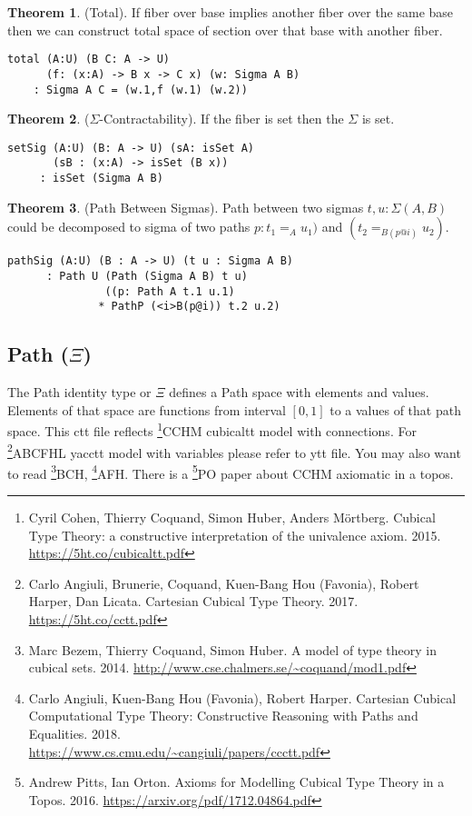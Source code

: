 \documentclass{article}
\theoremstyle{definition}
\newtheorem{theorem}{Theorem}
\begin{document}
\begin{theorem} (Total).
If fiber over base implies another fiber
over the same base then we can construct total space of section
over that base with another fiber.
\begin{lstlisting}
total (A:U) (B C: A -> U)
      (f: (x:A) -> B x -> C x) (w: Sigma A B)
    : Sigma A C = (w.1,f (w.1) (w.2))
\end{lstlisting}
\end{theorem}

\begin{theorem} ($\Sigma$-Contractability). If the fiber is set then the $\Sigma$ is set.
\begin{lstlisting}
setSig (A:U) (B: A -> U) (sA: isSet A)
       (sB : (x:A) -> isSet (B x))
     : isSet (Sigma A B)
\end{lstlisting}
\end{theorem}

\begin{theorem} (Path Between Sigmas).
Path between two sigmas $t,u: \Sigma(A,B)$ could be decomposed to
sigma of two paths $p:t_1=_{A}u_1)$ and $(t_2=_{B(p@i)}u_2)$.
\begin{lstlisting}
pathSig (A:U) (B : A -> U) (t u : Sigma A B)
      : Path U (Path (Sigma A B) t u)
               ((p: Path A t.1 u.1)
              * PathP (<i>B(p@i)) t.2 u.2)
\end{lstlisting}
\end{theorem}

\subsection{Path ($\Xi$)}

The Path identity type or $\Xi$ defines a Path space with elements and values.
Elements of that space are functions from interval $[0,1]$ to a values of that path space.
This ctt file reflects \footnote{Cyril Cohen, Thierry Coquand, Simon Huber, Anders M{\"{o}}rtberg. Cubical Type Theory: a constructive interpretation of the univalence axiom. 2015. \url{https://5ht.co/cubicaltt.pdf}}{CCHM} cubicaltt model with connections.
For \footnote{Carlo Angiuli, Brunerie, Coquand, Kuen-Bang Hou (Favonia), Robert Harper, Dan Licata. Cartesian Cubical Type Theory. 2017. \url{https://5ht.co/cctt.pdf}}{ABCFHL} yacctt model with
variables please refer to ytt file. You may also want to
read \footnote{Marc Bezem, Thierry Coquand, Simon Huber. A model of type theory in cubical sets. 2014. \url{http://www.cse.chalmers.se/~coquand/mod1.pdf}}{BCH},
\footnote{Carlo Angiuli, Kuen-Bang Hou (Favonia), Robert Harper. Cartesian Cubical Computational Type Theory: Constructive Reasoning with Paths and Equalities. 2018. \\ \url{https://www.cs.cmu.edu/~cangiuli/papers/ccctt.pdf}}{AFH}.
There is a \footnote{Andrew Pitts, Ian Orton. Axioms for Modelling Cubical Type Theory in a Topos. 2016. \url{https://arxiv.org/pdf/1712.04864.pdf}}{PO} paper about CCHM axiomatic in a topos.
\end{document}

